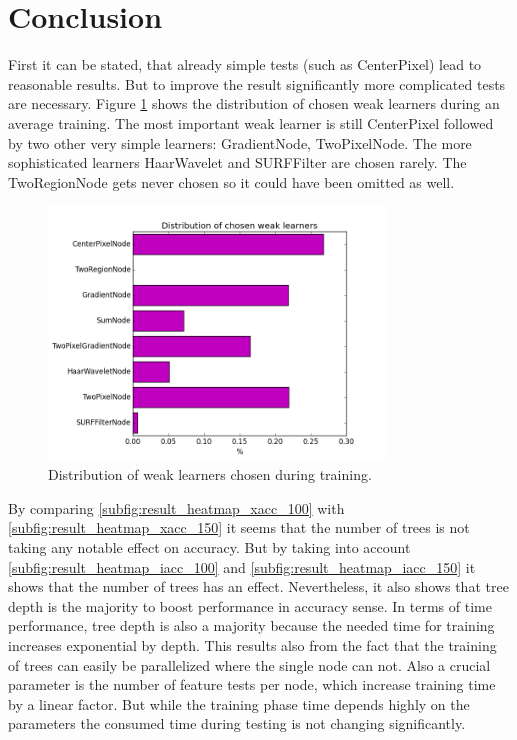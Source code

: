 \section{Conclusion}
\label{sec:conclusion}

First it can be stated, that already simple tests (such as CenterPixel) lead to reasonable results. But to improve the result significantly more complicated tests are necessary. Figure \ref{fig:learner_dist} shows the distribution of chosen weak learners during an average training. The most important weak learner is still CenterPixel
followed by two other very simple learners: GradientNode, TwoPixelNode. The more sophisticated learners HaarWavelet and SURFFilter are chosen rarely. The TwoRegionNode
gets never chosen so it could have been omitted as well.

\begin{figure}
	\centering
	\includegraphics[width=0.8\textwidth]{plots/weak_learner_distribution.png}
	\caption{Distribution of weak learners chosen during training.}
	\label{fig:learner_dist}
\end{figure}

By comparing \ref{subfig:result_heatmap_xacc_100} with \ref{subfig:result_heatmap_xacc_150} it seems that the number of trees is not taking any notable effect on accuracy. But by taking into account \ref{subfig:result_heatmap_iacc_100} and \ref{subfig:result_heatmap_iacc_150} it shows that the number of trees has an effect. Nevertheless, it also shows that tree depth is the majority to boost performance in accuracy sense. In terms of time performance, tree depth is also a majority because the needed time for training increases exponential by depth. This results also from the fact that the training of trees can easily be parallelized where the single node can not. Also a crucial parameter is the number of feature tests per node, which increase training time by a linear factor. But while the training phase time depends highly on the parameters the consumed time during testing is not changing significantly.

